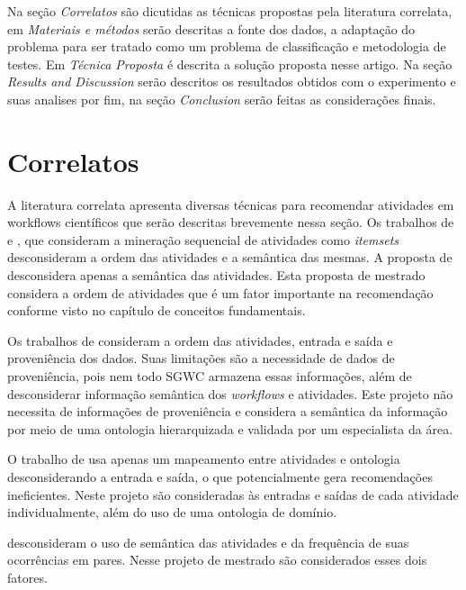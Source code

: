 \documentclass[10pt,letterpaper]{article}
\begin{document}
Na seção \emph{Correlatos} são dicutidas as técnicas propostas pela literatura correlata, em \emph{Materiais e métodos} serão descritas a fonte dos dados, a adaptação do problema para ser tratado como um problema de classificação e metodologia de testes. 
Em \emph{Técnica Proposta} é descrita a solução proposta nesse artigo. Na seção \emph{Results and Discussion} serão descritos os resultados obtidos com o experimento e suas analises por fim, na seção \emph{Conclusion} serão feitas as considerações finais.

\section*{Correlatos}
A literatura correlata apresenta diversas técnicas para recomendar atividades em workflows científicos que serão descritas brevemente nessa seção. Os trabalhos de  e , que consideram a mineração sequencial de atividades como \emph{itemsets} desconsideram a ordem das atividades e a semântica das mesmas. A proposta de  desconsidera apenas a semântica das atividades. Esta proposta de mestrado considera a ordem de atividades que é um fator importante na recomendação conforme visto no capítulo de conceitos fundamentais.

Os trabalhos de  consideram a ordem das atividades, entrada e saída e proveniência dos dados. Suas limitações são a necessidade de dados de proveniência, pois nem todo SGWC armazena essas informações, além de desconsiderar informação semântica dos \emph{workflows} e atividades. Este projeto não necessita de informações de proveniência e considera a semântica da informação por meio de uma ontologia hierarquizada e validada por um especialista da área.

O trabalho de  usa apenas um mapeamento entre atividades e ontologia desconsiderando a entrada e saída, o que potencialmente gera recomendações ineficientes. Neste projeto são consideradas às entradas e saídas de cada atividade individualmente, além do uso de uma ontologia de domínio.

 desconsideram o uso de semântica das atividades e da frequência de suas ocorrências em pares. Nesse projeto de mestrado são considerados esses dois fatores.
\end{document}
